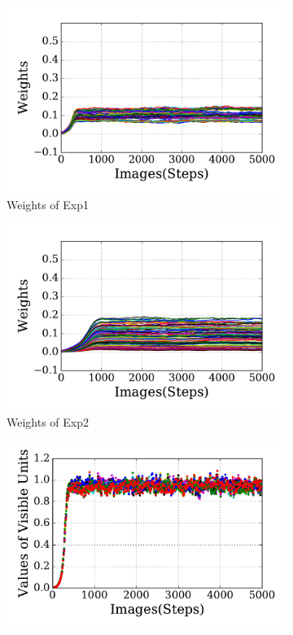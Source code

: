 \begin{figure}
	\centering
	\begin{subfigure}[t]{0.4\textwidth}
		\includegraphics[width=\textwidth]{pics_sdlm/31_exp_RBM_noise/exp1_weights_s.pdf}
		\caption{Weights of Exp1}
	\end{subfigure}
	\begin{subfigure}[t]{0.4\textwidth}
		\includegraphics[width=\textwidth]{pics_sdlm/31_exp_RBM_noise/exp2_weights_s.pdf}
		\caption{Weights of Exp2}
	\end{subfigure}
	\begin{subfigure}[t]{0.4\textwidth}
		\includegraphics[width=\textwidth]{pics_sdlm/31_exp_RBM_noise/exp1_recon_s.pdf}

\end{subfigure}
\end{figure}
